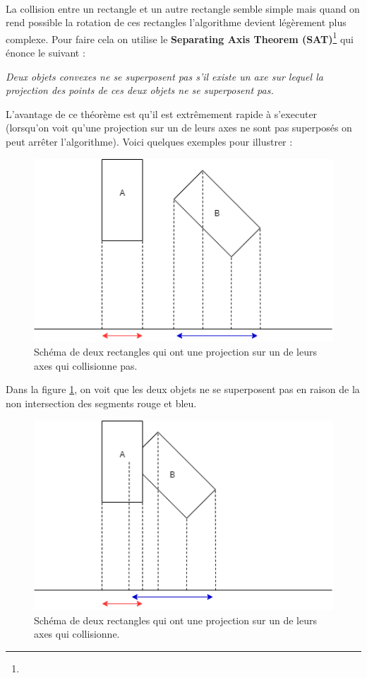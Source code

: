 \documentclass{EPUProjetDi}
\begin{document}
\paragraph{}
La collision entre un rectangle et un autre rectangle semble simple mais quand on rend possible la rotation de ces rectangles l'algorithme devient légèrement plus complexe.
Pour faire cela on utilise le \textbf{Separating Axis Theorem (SAT)}\footnote{} qui énonce le suivant :

\textit{Deux objets convexes ne se superposent pas s'il existe un axe sur lequel la projection des points de ces deux objets ne se superposent pas.}

L'avantage de ce théorème est qu'il est extrêmement rapide à s'executer (lorsqu'on voit qu'une projection sur un de leurs axes ne sont pas superposés on peut arrêter l'algorithme).
Voici quelques exemples pour illustrer : 

\begin{figure}[h]
    \centering
    \includegraphics[scale=0.6]{rectangle_collider_rectangle_1.png}
    \caption{Schéma de deux rectangles qui ont une projection sur un de leurs axes qui collisionne pas.}
    \label{fig:rectangle_collider_rectangle_1}
\end{figure}

Dans la figure \ref{fig:rectangle_collider_rectangle_1}, on voit que les deux objets ne se superposent pas en raison de la non intersection des segments rouge et bleu.

\begin{figure}[h]
    \centering
    \includegraphics[scale=0.6]{rectangle_collider_rectangle_2.png}
    \caption{Schéma de deux rectangles qui ont une projection sur un de leurs axes qui collisionne.}
    \label{fig:rectangle_collider_rectangle_2}
\end{figure}
\end{document}
